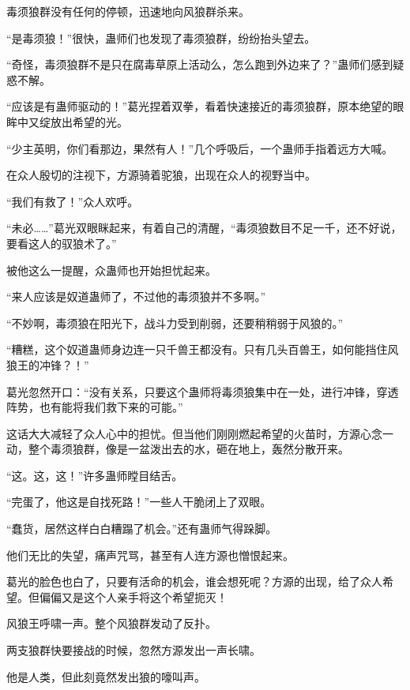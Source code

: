 
\begin{this_body}



毒须狼群没有任何的停顿，迅速地向风狼群杀来。

“是毒须狼！”很快，蛊师们也发现了毒须狼群，纷纷抬头望去。

“奇怪，毒须狼群不是只在腐毒草原上活动么，怎么跑到外边来了？”蛊师们感到疑惑不解。

“应该是有蛊师驱动的！”葛光捏着双拳，看着快速接近的毒须狼群，原本绝望的眼眸中又绽放出希望的光。

“少主英明，你们看那边，果然有人！”几个呼吸后，一个蛊师手指着远方大喊。

在众人殷切的注视下，方源骑着驼狼，出现在众人的视野当中。

“我们有救了！”众人欢呼。

“未必……”葛光双眼眯起来，有着自己的清醒，“毒须狼数目不足一千，还不好说，要看这人的驭狼术了。”

被他这么一提醒，众蛊师也开始担忧起来。

“来人应该是奴道蛊师了，不过他的毒须狼并不多啊。”

“不妙啊，毒须狼在阳光下，战斗力受到削弱，还要稍稍弱于风狼的。”

“糟糕，这个奴道蛊师身边连一只千兽王都没有。只有几头百兽王，如何能挡住风狼王的冲锋？！”

葛光忽然开口：“没有关系，只要这个蛊师将毒须狼集中在一处，进行冲锋，穿透阵势，也有能将我们救下来的可能。”

这话大大减轻了众人心中的担忧。但当他们刚刚燃起希望的火苗时，方源心念一动，整个毒须狼群，像是一盆泼出去的水，砸在地上，轰然分散开来。

“这。这，这！”许多蛊师瞠目结舌。

“完蛋了，他这是自找死路！”一些人干脆闭上了双眼。

“蠢货，居然这样白白糟蹋了机会。”还有蛊师气得跺脚。

他们无比的失望，痛声咒骂，甚至有人连方源也憎恨起来。

葛光的脸色也白了，只要有活命的机会，谁会想死呢？方源的出现，给了众人希望。但偏偏又是这个人亲手将这个希望扼灭！

风狼王呼啸一声。整个风狼群发动了反扑。

两支狼群快要接战的时候，忽然方源发出一声长啸。

他是人类，但此刻竟然发出狼的嚎叫声。


\end{this_body}
